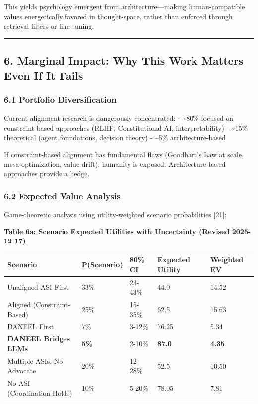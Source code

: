 \documentclass[
  11pt,
]{article}
\newcounter{none} %
\begin{document}
This yields psychology emergent from architecture---making
human-compatible values energetically favored in thought-space, rather
than enforced through retrieval filters or fine-tuning.

\begin{center}\rule{0.5\linewidth}{0.5pt}\end{center}

\subsection{6. Marginal Impact: Why This Work Matters Even If It
Fails}\label{marginal-impact-why-this-work-matters-even-if-it-fails}

\subsubsection{6.1 Portfolio
Diversification}\label{portfolio-diversification}

Current alignment research is dangerously concentrated: -
\textasciitilde80\% focused on constraint-based approaches (RLHF,
Constitutional AI, interpretability) - \textasciitilde15\% theoretical
(agent foundations, decision theory) - \textasciitilde5\%
architecture-based

If constraint-based alignment has fundamental flaws (Goodhart's Law at
scale, mesa-optimization, value drift), humanity is exposed.
Architecture-based approaches provide a hedge.

\subsubsection{6.2 Expected Value
Analysis}\label{expected-value-analysis}

Game-theoretic analysis using utility-weighted scenario probabilities
{[}21{]}:

\textbf{Table 6a: Scenario Expected Utilities with Uncertainty (Revised
2025-12-17)}

{\def\LTcaptype{none} %
\begin{longtable}[]{@{}lllll@{}}
\toprule\noalign{}
Scenario & P(Scenario) & 80\% CI & Expected Utility & Weighted EV \\
\midrule\noalign{}
\endhead
\bottomrule\noalign{}
\endlastfoot
Unaligned ASI First & 33\% & 23-43\% & 44.0 & 14.52 \\
Aligned (Constraint-Based) & 25\% & 15-35\% & 62.5 & 15.63 \\
DANEEL First & 7\% & 3-12\% & 76.25 & 5.34 \\
\textbf{DANEEL Bridges LLMs} & \textbf{5\%} & 2-10\% & \textbf{87.0} &
\textbf{4.35} \\
Multiple ASIs, No Advocate & 20\% & 12-28\% & 52.5 & 10.50 \\
No ASI (Coordination Holds) & 10\% & 5-20\% & 78.05 & 7.81 \\
\end{longtable}
}
\end{document}
